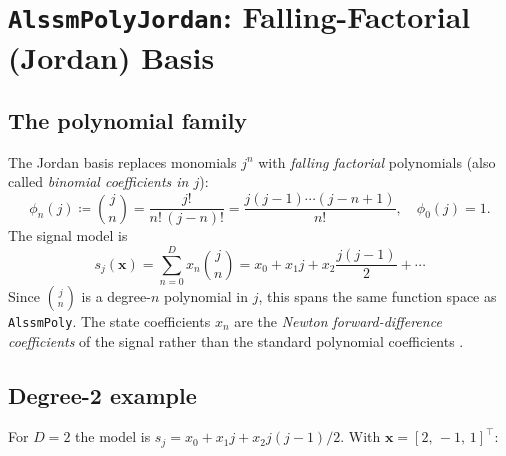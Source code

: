 \documentclass[11pt, a4paper]{article}
\theoremstyle{definition}
\newcommand{\vx}{\bm{x}}
\newcommand{\defeq}{\coloneqq}
\begin{document}
\section{\texttt{AlssmPolyJordan}: Falling-Factorial (Jordan) Basis}
\label{sec:jordan}

\subsection{The polynomial family}

The Jordan basis replaces monomials $j^n$ with \emph{falling factorial}
polynomials (also called \emph{binomial coefficients in $j$}):
\begin{equation}
  \phi_n(j) \defeq \binom{j}{n} = \frac{j!}{n!\,(j-n)!}
           = \frac{j(j-1)\cdots(j-n+1)}{n!}, \quad
  \phi_0(j) = 1.
\end{equation}
The signal model is
\begin{equation}
  s_j(\vx) = \sum_{n=0}^{D} x_n \binom{j}{n}
           = x_0 + x_1 j + x_2 \frac{j(j-1)}{2} + \cdots
\end{equation}
Since $\binom{j}{n}$ is a degree-$n$ polynomial in $j$, this spans the
same function space as \texttt{AlssmPoly}.  The state coefficients
$x_n$ are the \emph{Newton forward-difference coefficients} of the signal
rather than the standard polynomial coefficients \cite{Zalmai2017}.

\subsection{Degree-2 example}

For $D=2$ the model is $s_j = x_0 + x_1 j + x_2 j(j-1)/2$.  With
$\vx = [2,\,-1,\,1]^\top$:
\begin{center}
\end{center}
\end{document}

